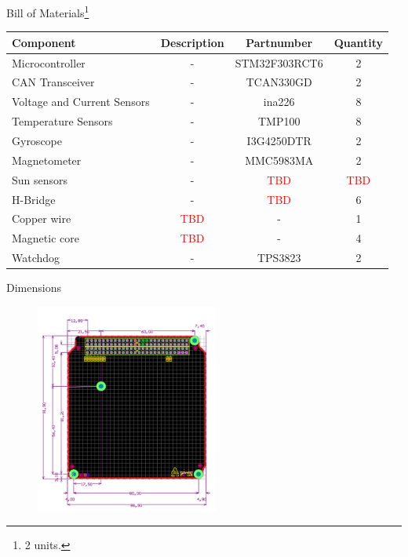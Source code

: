 \documentclass{beamer}
\begin{document}

\begin{frame}{Bill of Materials\footnote{2 units.}}

\begin{table}[!htb]\scriptsize
    \centering
    \label{tab:cost-estimation}
    \begin{tabular}{lccc}
        \toprule[1.5pt]
        \textbf{Component} & \textbf{Description} & \textbf{Partnumber} & \textbf{Quantity} \\
        \midrule
        Microcontroller       &  - & STM32F303RCT6  & 2 \\
        CAN Transceiver       & - & TCAN330GD  & 2 \\
        Voltage and Current Sensors   & - & ina226 & 8\\
        Temperature Sensors   & - & TMP100 & 8\\
        Gyroscope             & - & I3G4250DTR & 2\\
        Magnetometer          & - & MMC5983MA & 2\\
        Sun sensors           & - & \textcolor{red}{TBD} & \textcolor{red}{TBD}\\
        H-Bridge              & - & \textcolor{red}{TBD} & 6 \\
        Copper wire           & \textcolor{red}{TBD} & - & 1 \\
        Magnetic core         & \textcolor{red}{TBD} & - & 4 \\
        Watchdog              & - & TPS3823 & 2 \\
        
        \bottomrule[1.5pt]
    \end{tabular}
\end{table}

\end{frame}

\begin{frame}{Dimensions}
    
    \begin{figure}[!ht]
        \begin{center}
            \includegraphics[width=6cm]{figures/board-dimensions-adcs.png}
        \end{center}
    \end{figure}

\end{frame}
\end{document}
